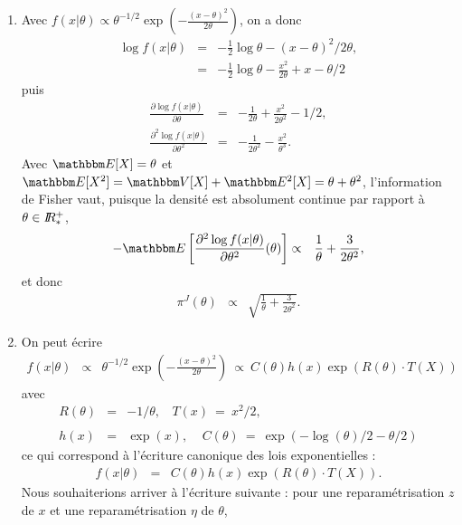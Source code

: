 \begin{rep}
\begin{enumerate}
\item Avec $f(x|\theta)   \propto  \theta^{-1/2} \exp\left(-\frac{(x-\theta)^2}{2\theta} \right)$, on a donc
\begin{eqnarray*}
\log f(x|\theta) & = & - \frac{1}{2}\log\theta - (x-\theta)^2/2\theta, \\
& = & - \frac{1}{2}\log\theta - \frac{x^2}{2\theta} + x - \theta/2
\end{eqnarray*}
puis
\begin{eqnarray*}
\frac{\partial \log f(x|\theta) }{\partial \theta} & = & -\frac{1}{2\theta}  + \frac{x^2}{2\theta^2} -1/2, \\
\frac{\partial^2 \log f(x|\theta) }{\partial \theta^2} & = & -\frac{1}{2\theta^2} - \frac{x^2}{\theta^3}.
\end{eqnarray*}
Avec $\E[X]=\theta$ et $\E[X^2] = \V[X]+\E^2[X]= \theta+ \theta^2$, l'information de Fisher vaut, puisque la densité est absolument continue par rapport à $\theta\in I\!\!R^+_*$,
\begin{eqnarray*}
-\E\left[\frac{\partial^2 \log f(x|\theta) }{\partial \theta^2}(\theta)\right] & \propto & \frac{1}{\theta} + \frac{3}{2\theta^2},
\end{eqnarray*}
et donc
\begin{eqnarray*}
\pi^J(\theta) & \propto &\sqrt{ \frac{1}{\theta} + \frac{3}{2\theta^2}}.
\end{eqnarray*}
\item  On peut écrire
\begin{eqnarray*}
f(x|\theta) & \propto & \theta^{-1/2} \exp\left(-\frac{(x-\theta)^2}{2\theta}\right) \ \propto \  C(\theta) h(x)  \exp\left(R(\theta)\cdot T(X)\right)
\end{eqnarray*}
avec
\begin{eqnarray*}
R(\theta) & = &  -1/\theta, \ \ \ \   T(x) \ = \ x^2/2, \\ \\
h(x) & = & \exp(x), \ \ \ \  \ 
C(\theta)  \ = \  \exp(-\log(\theta)/2 - \theta/2)
\end{eqnarray*}
ce qui correspond à l'écriture canonique des lois exponentielles :
\begin{eqnarray*}
f(x|\theta) & = & C(\theta) h(x) \exp\left(R(\theta)\cdot T(X)\right).
\end{eqnarray*}
Nous souhaiterions arriver à l'écriture suivante : pour une reparamétrisation $z$ de $x$ et une reparamétrisation  $\eta$ de $\theta$, 

\end{enumerate}
\end{rep}
